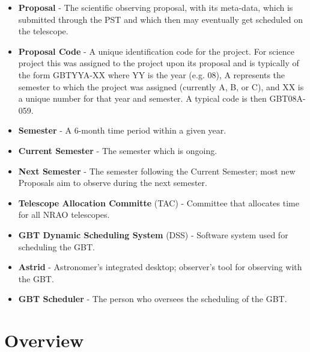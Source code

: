 \documentclass{article}
\begin{document}
\begin{itemize}
\item {\bf Proposal} - The scientific observing proposal, with its meta-data, which is submitted through the PST and which then may
eventually get scheduled on the telescope. 
\item {\bf Proposal Code} -  A unique identification code for the project. For science project this was assigned to the
project upon its proposal and is typically of the form GBTYYA-XX where YY is the year (e.g. 08), A
represents the semester to which the project was assigned (currently A, B, or C), and XX is a unique
number for that year and semester. A typical code is then GBT08A-059.
\item {\bf Semester} - A 6-month time period within a given year.  
\item {\bf Current Semester} - The semester which is ongoing.
\item {\bf Next Semester} - The semester following the Current Semester; most new Proposals aim to observe during the next semester.
\item {\bf Telescope Allocation Committe} (TAC) - Committee that allocates time for all NRAO telescopes.
\item {\bf GBT Dynamic Scheduling System} (DSS) - Software system used for scheduling the GBT.
\item {\bf Astrid } - Astronomer's integrated desktop; observer's tool for observing with the GBT.
\item {\bf GBT Scheduler} - The person who oversees the scheduling of the GBT.
\end{itemize}

\section{Overview}
\end{document}
